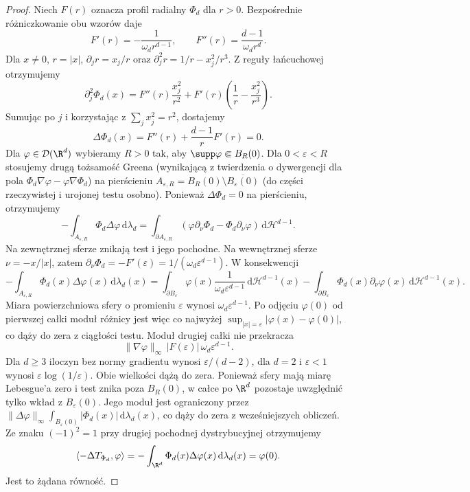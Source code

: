 \begin{proof}
Niech $F(r)$ oznacza profil radialny $\Phi_d$ dla $r>0$.
Bezpośrednie różniczkowanie obu wzorów daje
\[
 F'(r)=-\frac1{\omega_dr^{d-1}},\qquad
 F''(r)=\frac{d-1}{\omega_dr^d}.
\]
Dla $x\ne0$, $r=|x|$,
$\partial_jr=x_j/r$ oraz
$\partial_j^2r=1/r-x_j^2/r^3$.
Z reguły łańcuchowej otrzymujemy
\[
 \partial_j^2\Phi_d(x)
 =F''(r)\frac{x_j^2}{r^2}
 +F'(r)\left(\frac1r-\frac{x_j^2}{r^3}\right).
\]
Sumując po $j$ i korzystając z $\sum_j x_j^2=r^2$,
dostajemy
\[
 \Delta\Phi_d(x)
 =F''(r)+\frac{d-1}{r}F'(r)=0.
\]
Dla $\varphi\in\mathcal D(\R^d)$ wybieramy $R>0$
tak, aby $\supp\varphi\Subset B_R(0)$.
Dla $0<\varepsilon<R$ stosujemy drugą tożsamość
Greena (wynikającą z twierdzenia o dywergencji
dla pola $\Phi_d\nabla\varphi-\varphi\nabla\Phi_d$) na pierścieniu
$A_{\varepsilon,R}=B_R(0)\setminus\overline{B_\varepsilon(0)}$
(do części rzeczywistej i urojonej testu osobno).
Ponieważ $\Delta\Phi_d=0$ na pierścieniu,
otrzymujemy
\[
 -\int_{A_{\varepsilon,R}}\Phi_d\Delta\varphi
 \,\mathrm d\lambda_d
 =\int_{\partial A_{\varepsilon,R}}
 (\varphi\partial_\nu\Phi_d-\Phi_d\partial_\nu\varphi)
 \,\mathrm d\mathcal H^{d-1}.
\]
Na zewnętrznej sferze znikają test i jego pochodne.
Na wewnętrznej sferze $\nu=-x/|x|$, zatem
$\partial_\nu\Phi_d=-F'(\varepsilon)
=1/(\omega_d\varepsilon^{d-1})$.
W konsekwencji
\[
 -\int_{A_{\varepsilon,R}}\Phi_d(x)\Delta\varphi(x)
 \,\mathrm d\lambda_d(x)
 =\int_{\partial B_\varepsilon}\varphi(x)
 \frac{1}{\omega_d\varepsilon^{d-1}}\,\mathrm d\mathcal H^{d-1}(x)
 -\int_{\partial B_\varepsilon}\Phi_d(x)
 \partial_\nu\varphi(x)\,\mathrm d\mathcal H^{d-1}(x).
\]
Miara powierzchniowa sfery o promieniu $\varepsilon$
wynosi $\omega_d\varepsilon^{d-1}$. Po odjęciu
$\varphi(0)$ od pierwszej całki moduł różnicy
jest więc co najwyżej
$\sup_{|x|=\varepsilon}|\varphi(x)-\varphi(0)|$,
co dąży do zera z ciągłości testu.
Moduł drugiej całki nie przekracza
\[
 \|\nabla\varphi\|_\infty\,
 |F(\varepsilon)|\,\omega_d\varepsilon^{d-1}.
\]
Dla $d\ge3$ iloczyn bez normy gradientu wynosi
$\varepsilon/(d-2)$, dla $d=2$ i $\varepsilon<1$
wynosi $\varepsilon\log(1/\varepsilon)$.
Obie wielkości dążą do zera.
Ponieważ sfery mają miarę Lebesgue'a zero
i test znika poza $B_R(0)$, w całce po $\R^d$
pozostaje uwzględnić tylko wkład z $B_\varepsilon(0)$.
Jego moduł jest ograniczony przez
$\|\Delta\varphi\|_\infty
\int_{B_\varepsilon(0)}|\Phi_d(x)|\,\mathrm d\lambda_d(x)$,
co dąży do zera z wcześniejszych obliczeń.
Ze znaku $(-1)^2=1$ przy drugiej pochodnej
dystrybucyjnej otrzymujemy
\[
 \langle-\Delta T_{\Phi_d},\varphi\rangle
 =-\int_{\R^d}\Phi_d(x)\Delta\varphi(x)
 \,\mathrm d\lambda_d(x)=\varphi(0).
\]
Jest to żądana równość.
\end{proof}

